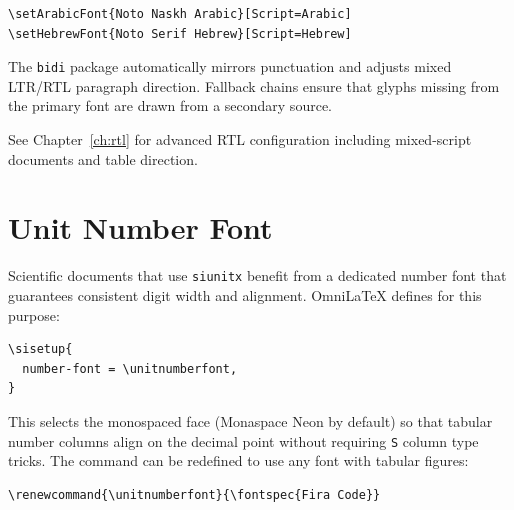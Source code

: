 \begin{verbatim}
\setArabicFont{Noto Naskh Arabic}[Script=Arabic]
\setHebrewFont{Noto Serif Hebrew}[Script=Hebrew]
\end{verbatim}

The \texttt{bidi} package automatically mirrors punctuation and adjusts
mixed LTR/RTL paragraph direction.  Fallback chains ensure that glyphs
missing from the primary font are drawn from a secondary source.

See Chapter~\ref{ch:rtl} for advanced RTL configuration including
mixed-script documents and table direction.

\section{Unit Number Font}

Scientific documents that use \texttt{siunitx} benefit from a dedicated
number font that guarantees consistent digit width and alignment.
OmniLaTeX defines  for this purpose:

\begin{verbatim}
\sisetup{
  number-font = \unitnumberfont,
}
\end{verbatim}

This selects the monospaced face (Monaspace Neon by default) so that
tabular number columns align on the decimal point without requiring
\texttt{S} column type tricks.  The command can be redefined to use any
font with tabular figures:

\begin{verbatim}
\renewcommand{\unitnumberfont}{\fontspec{Fira Code}}
\end{verbatim}
